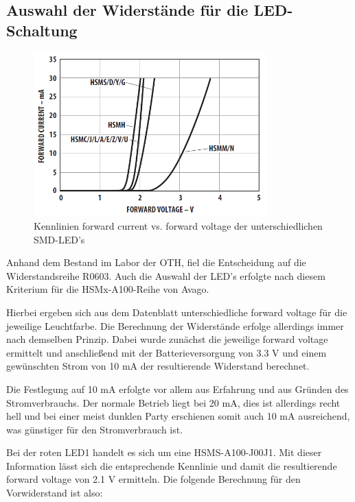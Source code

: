 \documentclass[a4paper,
DIV=13,
12pt,
BCOR=10mm,
department=FakEI,
parskip=half,
automark,
]{article}
\begin{document}
\subsection{Auswahl der Widerstände für die LED-Schaltung}

\begin{figure}[!hbpt]
 \begin{center} \includegraphics[width=0.8\textwidth]{Kennlinien_LED_SMD.png}
 \caption{Kennlinien forward current vs. forward voltage der unterschiedlichen SMD-LED's \cite{LED}}
 \label{fig:Widerstände}
  \end{center}
\end{figure}
Anhand dem Bestand im Labor der OTH, fiel die Entscheidung auf die Widerstandsreihe R0603. Auch die Auswahl der LED's erfolgte nach diesem Kriterium für die HSMx-A100-Reihe von Avago. 

Hierbei ergeben sich aus dem Datenblatt unterschiedliche forward voltage für die jeweilige Leuchtfarbe. Die Berechnung der Widerstände erfolge allerdings immer nach demselben Prinzip. 
Dabei wurde zunächst die jeweilige forward voltage ermittelt und anschließend mit der Batterieversorgung von 3.3 V und einem gewünschten Strom von 10 mA der resultierende Widerstand berechnet. 

Die Festlegung auf 10 mA erfolgte vor allem aus Erfahrung und aus Gründen des Stromverbrauchs. Der normale Betrieb liegt bei 20 mA, dies ist allerdings recht hell und bei einer meist dunklen Party erschienen somit auch 10 mA ausreichend, was günstiger für den Stromverbrauch ist.\\

\newpage

Bei der roten LED1 handelt es sich um eine HSMS-A100-J00J1. Mit dieser Information lässt sich die entsprechende Kennlinie und damit die resultierende forward voltage von 2.1 V ermitteln.
Die folgende Berechnung für den Vorwiderstand ist also:
\end{document}
